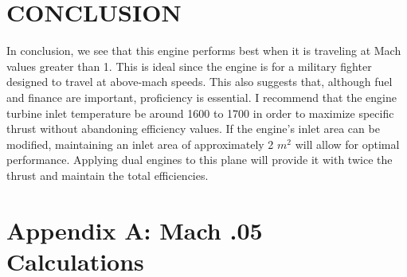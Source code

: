 \documentclass[12pt]{report}
\begin{document}
\chapter{CONCLUSION}
In conclusion, we see that this engine performs best when it is traveling at Mach values greater than 1. This is ideal since the engine is for a military fighter designed to travel at above-mach speeds. This also suggests that, although fuel and finance are important, proficiency is essential.  I recommend that the engine turbine inlet temperature be around 1600 to 1700 in order to maximize specific thrust without abandoning efficiency values. If the engine's inlet area can be modified, maintaining an inlet area of approximately 2 $m^2$ will allow for optimal performance. Applying dual engines to this plane will provide it with twice the thrust and maintain the total efficiencies.
\clearpage

\appendix
\chapter{Appendix A: Mach .05 Calculations}
\end{document}
